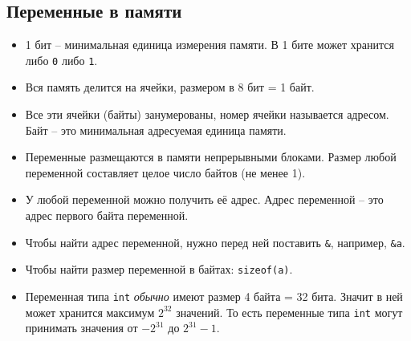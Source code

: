 \documentclass[10pt]{article}
\begin{document}
\subsection*{Переменные в памяти}
\begin{itemize}
\item 1 бит -- минимальная единица измерения памяти. В 1 бите может хранится либо \texttt{0} либо \texttt{1}.
\item Вся память делится на ячейки, размером в 8 бит = 1 байт.
\item Все эти ячейки (байты) занумерованы, номер ячейки называется адресом. Байт -- это минимальная адресуемая единица памяти.
\item Переменные размещаются в памяти непрерывными блоками. Размер любой переменной составляет целое число байтов (не менее 1).
\item У любой переменной можно получить её адрес. Адрес переменной -- это адрес первого байта переменной.
\item Чтобы найти адрес переменной, нужно перед ней поставить \texttt{\&}, например, \texttt{\&a}.
\item Чтобы найти размер переменной в байтах: \texttt{sizeof(a)}.
\item Переменная типа \texttt{int} \textit{обычно} имеют размер 4 байта = 32 бита. Значит в ней может хранится максимум $2^{32}$ значений. То есть переменные типа \texttt{int} могут принимать значения от $-2^{31}$ до $2^{31} - 1$.
\end{itemize}
\end{document}
